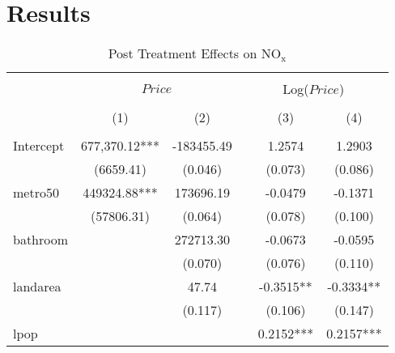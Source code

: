 \documentclass[12pt]{report}
\begin{document}
\section*{Results}
\begin{table}[h!]
\centering
\begin{threeparttable}

\caption{Post Treatment Effects on $\text{NO}_\text{x}$}
\begin{tabular}{lccccc} 
\hline\hline\\[0.001ex]
         &           \multicolumn{2}{c}{$Price$} &                        \multicolumn{3}{c}{Log($Price$)}                 \\ [0.1ex] \cline{2-3} \cline{5-6}  
\\[0.001ex]
         &                   (1) &              (2) &&                      (3) &                            (4) \\ [0.5ex] 
\hline \\[0.1ex]
Intercept &        677,370.12*** &  -183455.49       &&           1.2574      &                            1.2903   \\ [0.5ex]
          &           (6659.41)          &  (0.046)        &&         (0.073)       &                          (0.086) \\ [0.5ex]
metro50 &         449324.88*** &    173696.19   &&          -0.0479      &                         -0.1371    \\ [0.5ex]
           &        (57806.31)       & (0.064)         &&          (0.078)       &                         (0.100) \\ [0.5ex]
bathroom &                                  &  272713.30       &&            -0.0673      &                        -0.0595    \\ [0.5ex]
           &                         & (0.070)        &&          (0.076)        &                        (0.110) \\ [0.5ex] 
landarea &                       &  47.74   & &         -0.3515**    &                        -0.3334**   \\ [0.5ex]
              &                     &  (0.117)       & &         (0.106)        &                         (0.147) \\ [0.5ex]
lpop &                          &                     &&          0.2152***  &                         0.2157***   \\ [0.5ex]

\end{tabular}
\end{threeparttable}
\end{table}
\end{document}
